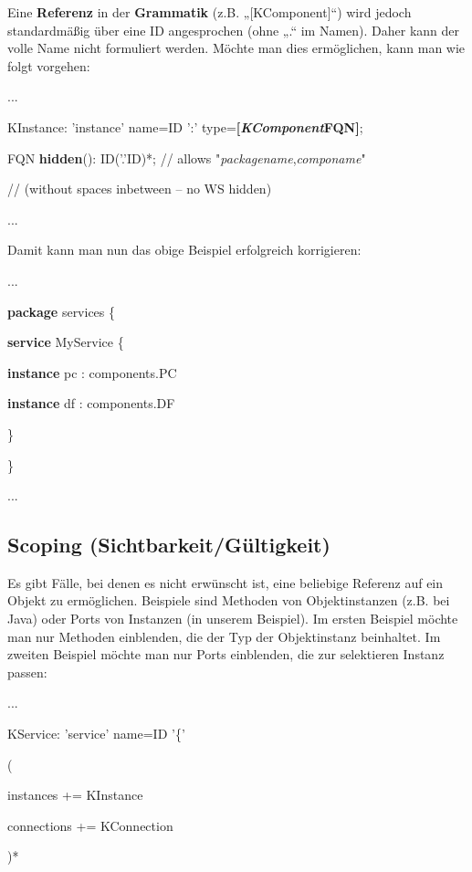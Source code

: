 \documentclass[a4]{article}
\begin{document}
Eine \textbf{Referenz} in der \textbf{Grammatik }(z.B.
„{[}KComponent{]}``) wird jedoch standardmäßig über eine ID angesprochen
(ohne „.`` im Namen). Daher kann der volle Name nicht formuliert werden.
Möchte man dies ermöglichen, kann man wie folgt vorgehen:

...

KInstance: 'instance' name=ID ':'
type=\textbf{{[}}\emph{\textbf{KComponent}}\textbf{\textbar{}FQN{]}};

FQN \textbf{hidden}(): ID('.'ID)*; // allows
"\emph{packagename},\emph{componame}"

// (without spaces inbetween -- no WS hidden)

...

Damit kann man nun das obige Beispiel erfolgreich korrigieren:

...

\textbf{package} services \{

\textbf{service} MyService \{

\textbf{instance} pc : components.PC

\textbf{instance} df : components.DF

\}

\}

...

\subsection[Scoping
(Sichtbarkeit/Gültigkeit)]{\texorpdfstring{\protect\hypertarget{anchor-45}{}{}\protect\hypertarget{anchor-46}{}{}Scoping
(Sichtbarkeit/Gültigkeit)}{Scoping (Sichtbarkeit/Gültigkeit)}}\label{scoping-sichtbarkeitguxfcltigkeit}

Es gibt Fälle, bei denen es nicht erwünscht ist, eine beliebige Referenz
auf ein Objekt zu ermöglichen. Beispiele sind Methoden von
Objektinstanzen (z.B. bei Java) oder Ports von Instanzen (in unserem
Beispiel). Im ersten Beispiel möchte man nur Methoden einblenden, die
der Typ der Objektinstanz beinhaltet. Im zweiten Beispiel möchte man nur
Ports einblenden, die zur selektieren Instanz passen:

...

KService: 'service' name=ID '\{'

(

instances += KInstance\textbar{}

connections += KConnection

)*
\end{document}
